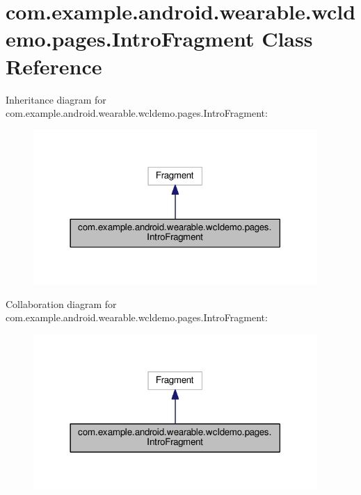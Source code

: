\hypertarget{classcom_1_1example_1_1android_1_1wearable_1_1wcldemo_1_1pages_1_1IntroFragment}{}\section{com.\+example.\+android.\+wearable.\+wcldemo.\+pages.\+Intro\+Fragment Class Reference}
\label{classcom_1_1example_1_1android_1_1wearable_1_1wcldemo_1_1pages_1_1IntroFragment}


Inheritance diagram for com.\+example.\+android.\+wearable.\+wcldemo.\+pages.\+Intro\+Fragment\+:
\nopagebreak
\begin{figure}[H]
\begin{center}
\leavevmode
\includegraphics[width=306pt]{d8/d4d/classcom_1_1example_1_1android_1_1wearable_1_1wcldemo_1_1pages_1_1IntroFragment__inherit__graph}
\end{center}
\end{figure}


Collaboration diagram for com.\+example.\+android.\+wearable.\+wcldemo.\+pages.\+Intro\+Fragment\+:
\nopagebreak
\begin{figure}[H]
\begin{center}
\leavevmode
\includegraphics[width=306pt]{dd/d1e/classcom_1_1example_1_1android_1_1wearable_1_1wcldemo_1_1pages_1_1IntroFragment__coll__graph}
\end{center}
\end{figure}
